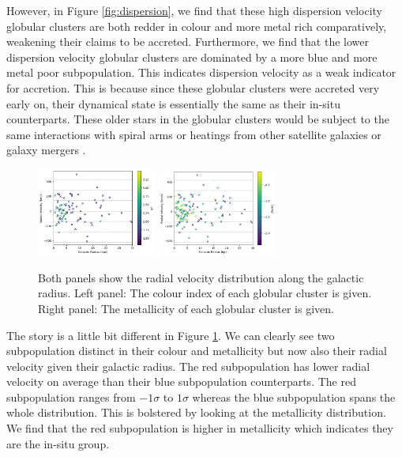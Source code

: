\documentclass[fleqn,usenatbib]{mnras}
\begin{document}
However, in Figure \ref{fig:dispersion}, we find that these high dispersion velocity globular clusters 
are both redder in colour and more metal rich comparatively, weakening their claims to be accreted. 
Furthermore, we find that the lower dispersion velocity globular clusters are dominated by a more blue 
and more metal poor subpopulation. This indicates dispersion velocity as a weak indicator for accretion. 
This is because since these globular clusters were accreted very early on, their dynamical state is 
essentially the same as their in-situ counterparts. These older stars in the globular clusters would be 
subject to the same interactions with spiral arms or heatings from other satellite galaxies or galaxy 
mergers \citep{Fatheddin_2023}.

\begin{figure}
    \includegraphics[width=0.35\textwidth]{rgcvr.png}
    \includegraphics[width=0.35\textwidth]{rgcvr1.png}
    \caption{Both panels show the radial velocity distribution along the galactic radius. Left panel:
    The colour index of each globular cluster is given. Right panel: The metallicity of each globular cluster 
    is given.}
    \label{fig:radial}
\end{figure}

The story is a little bit different in Figure \ref{fig:radial}. We can clearly see two subpopulation 
distinct in their colour and metallicity but now also their radial velocity given their galactic radius.
The red subpopulation has lower radial velocity on average than their blue subpopulation counterparts. 
The red subpopulation ranges from $-1\sigma$ to $1\sigma$ whereas the blue subpopulation spans the whole 
distribution. This is bolstered by looking at the metallicity distribution. We find that the red subpopulation 
is higher in metallicity which indicates they are the in-situ group. 
\end{document}
